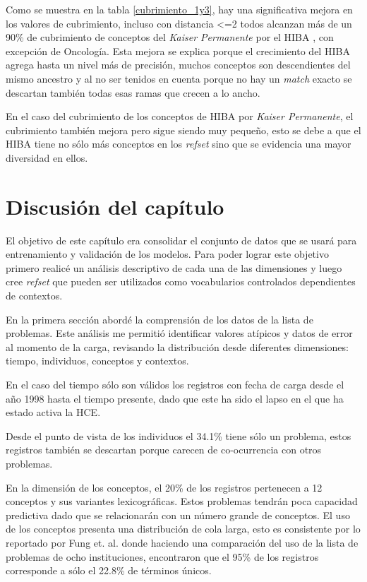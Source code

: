 Como se muestra en la tabla \ref{cubrimiento_1y3}, hay una significativa mejora en los valores de cubrimiento, incluso con distancia \textless=2 todos alcanzan más de un 90\% de cubrimiento de conceptos del \textit{Kaiser Permanente} por el \acrshort{HIBA} , con excepción de Oncología. Esta mejora se explica porque el crecimiento del \acrshort{HIBA} agrega hasta un nivel más de precisión, muchos conceptos son descendientes del mismo ancestro y al no ser tenidos en cuenta porque no hay un \textit{match} exacto se descartan también todas esas ramas que crecen a lo ancho.

En el caso del cubrimiento de los conceptos de \acrshort{HIBA} por \textit{Kaiser Permanente}, el cubrimiento también mejora pero sigue siendo muy pequeño, esto se debe a que el  \acrshort{HIBA} tiene no sólo más conceptos en los \textit{\acrshort{refset}}  sino que se evidencia una mayor diversidad en ellos.
 
\section{Discusión del capítulo}
El objetivo de este capítulo era consolidar el conjunto de datos que se usará para entrenamiento y validación de los modelos. Para poder lograr este objetivo primero realicé un análisis descriptivo de cada una de las dimensiones y luego cree \textit{\acrshort{refset}} que pueden ser utilizados como vocabularios controlados dependientes de contextos.

En la primera sección abordé la comprensión de los datos de la lista de problemas. Este análisis me permitió identificar valores atípicos y datos de error al momento de la carga, revisando la distribución desde diferentes dimensiones: tiempo, individuos, conceptos y contextos. 

En el caso del tiempo sólo son válidos los registros con fecha de carga desde el año 1998 hasta el tiempo presente, dado que este ha sido el lapso en el que ha estado activa la \acrshort{HCE}.

Desde el punto de vista de los individuos  el 34.1\% tiene sólo un problema, estos registros también se descartan porque carecen de co-ocurrencia con otros problemas.

En la dimensión de los conceptos, el 20\% de los registros pertenecen a 12 conceptos y sus variantes lexicográficas. Estos problemas tendrán poca capacidad predictiva dado que se relacionarán con un número grande de conceptos. El uso de los conceptos presenta una distribución de cola larga, esto es consistente por lo reportado por Fung et. al.\cite{Fung2015AnCT} donde haciendo una comparación del uso de la lista de problemas de ocho instituciones, encontraron que el 95\% de los registros corresponde a sólo el 22.8\% de términos únicos.

